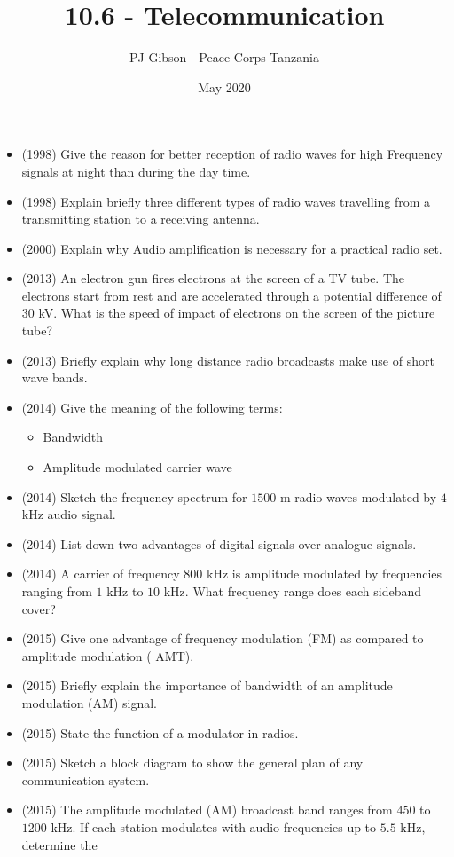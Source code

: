\documentclass{article}
\title{\textbf{10.6 - Telecommunication}}
\author{PJ Gibson - Peace Corps Tanzania}
\date{May 2020}
\begin{document}
\maketitle

\begin{itemize}
\item (1998)  Give the reason for better reception of radio waves for high Frequency signals at night than during the day time.
\item (1998)  Explain briefly three different types of radio waves travelling from a transmitting station to a receiving antenna.
\item (2000)  Explain why Audio amplification is necessary for a practical radio set.
\item (2013)  An electron gun fires electrons at the screen of a TV tube. The electrons start from rest and are accelerated through a potential difference of $ 30$ kV. What is the speed of impact of electrons on the screen of the picture tube?
\item (2013)  Briefly explain why long distance radio broadcasts make use of short wave bands.
\item (2014)  Give the meaning of the following terms:
 \begin{itemize}
\item Bandwidth
\item  Amplitude modulated carrier wave
\end{itemize}
\item (2014)  Sketch the frequency spectrum for $ 1500$ m radio waves modulated by $ 4$ kHz audio signal.
\item (2014)  List down two advantages of digital signals over analogue signals.
\item (2014)  A carrier of frequency $ 800$ kHz is amplitude modulated by frequencies ranging from $ 1$ kHz to $ 10$ kHz.  What frequency range does each sideband cover?
\item (2015)  Give one advantage of frequency modulation (FM) as compared to amplitude modulation ( AMT).
\item (2015)  Briefly explain the importance of bandwidth of an amplitude modulation (AM) signal.
\item (2015)  State the function of a modulator in radios.
\item (2015)  Sketch a block diagram to show the general plan of any communication system.
\item (2015)  The amplitude modulated (AM) broadcast band ranges from $ 450$ to $ 1200$ kHz. If each station modulates with audio frequencies up to $ 5.5$ kHz, determine the

\end{itemize}
\end{document}
